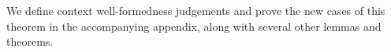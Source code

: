 \documentclass{sig-alternate}[10pt]
\begin{document}
We define context well-formedness judgements and prove the new cases of this theorem in the accompanying appendix, along with several other lemmas and theorems.%





%

\end{document}
